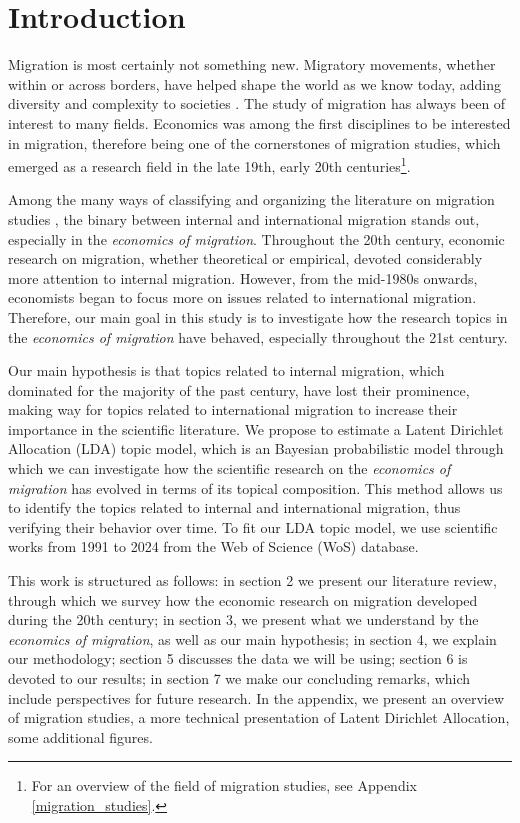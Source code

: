 \section{Introduction} \label{introduction}

Migration is most certainly not something new. Migratory movements, whether within or across borders, have helped shape the world as we know today, adding diversity and complexity to societies \citep{schrover_migration_2022}. The study of migration has always been of interest to many fields. Economics was among the first disciplines to be interested in migration, therefore being one of the cornerstones of migration studies, which emerged as a research field in the late 19th, early 20th centuries\footnote{For an overview of the field of migration studies, see Appendix \ref{migration_studies}.}\citep{greenwood_early_2003, levy_between_2020, scholten_introduction_2022}. 

Among the many ways of classifying and organizing the literature on migration studies \citep{cohen_introduction_1996, king_towards_2002, king_mind_2010, king_theories_2012}, the binary between internal and international migration stands out, especially in the \textit{economics of migration}. Throughout the 20th century, economic research on migration, whether theoretical or empirical, devoted considerably more attention to internal migration. However, from the mid-1980s onwards, economists began to focus more on issues related to international migration. Therefore, our main goal in this study is to investigate how the research topics in the \textit{economics of migration} have behaved, especially throughout the 21st century.

Our main hypothesis is that topics related to internal migration, which dominated for the majority of the past century, have lost their prominence, making way for topics related to international migration to increase their importance in the scientific literature. We propose to estimate a Latent Dirichlet Allocation (LDA) topic model, which is an Bayesian probabilistic model through which we can investigate how the scientific research on the \textit{economics of migration} has evolved in terms of its topical composition. This method allows us to identify the topics related to internal and international migration, thus verifying their behavior over time. To fit our LDA topic model, we use scientific works from 1991 to 2024 from the Web of Science (WoS) database.

This work is structured as follows: in section 2 we present our literature review, through which we survey how the economic research on migration developed during the 20th century; in section 3, we present what we understand by the \textit{economics of migration}, as well as our main hypothesis; in section 4, we explain our methodology; section 5 discusses the data we will be using; section 6 is devoted to our results; in section 7 we make our concluding remarks, which include perspectives for future research. In the appendix, we present an overview of migration studies, a more technical presentation of Latent Dirichlet Allocation, some additional figures.